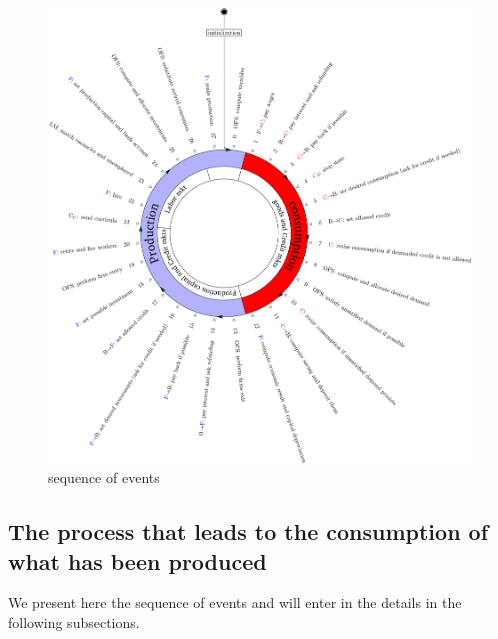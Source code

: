 \documentclass{book}
\begin{document}
\begin{figure}[htp]
	\centering
\includegraphics[scale=0.5]{visual1.pdf}
	\caption{sequence of events}
	\label{fig:clockcolor}
\end{figure}

\subsection{The process that leads to the consumption of what has been produced}
We present here the sequence of events and will enter in the details in the following subsections.
\end{document}
